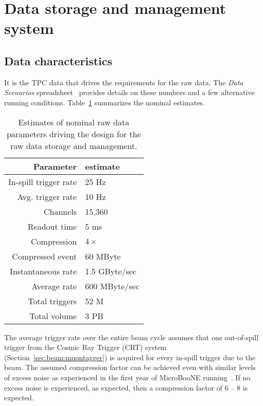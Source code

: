 \section{Data storage and management system}

\subsection{Data characteristics}

It is the TPC data that drives the requirements for the raw \pdsp data.
The \textit{\pdsp Data Scenarios} spreadsheet~\cite{data_spreadsheet}  %
provides details on these %
numbers and a few alternative running conditions.
Table~\ref{tab:goldi} summarizes the nominal estimates.

\begin{table}[h]
  \centering
  \begin{tabular}[h]{|r|l|}
    \hline
    Parameter & estimate  \\
    \hline
    In-spill trigger rate & 25 Hz \\
    Avg. trigger rate & 10 Hz \\
    Channels & 15,360 \\
    Readout time & 5 ms \\
    Compression & $4\times$ \\
    \hline
    Compressed event & 60 MByte  \\
    Instantaneous rate & 1.5 GByte/sec \\
    Average rate & 600 MByte/sec \\
    \hline
    Total triggers & 52 M \\
    Total volume & 3 PB  \\
    \hline
  \end{tabular}
  \caption{Estimates of nominal raw data parameters driving the design for the raw data storage and management.}
  \label{tab:goldi}
\end{table}

The average trigger rate over the entire beam cycle assumes that one
out-of-spill trigger from the Cosmic Ray Trigger (CRT) system (Section~\ref{sec:beam:muontagger}) 
is acquired
for every in-spill trigger due to the beam.  The assumed compression
factor can be achieved even with similar levels of excess noise as
experienced in the first year of MicroBooNE running~\cite{qian-viren-reduc}.
If no excess noise is experienced, as expected, then a compression factor
of 6 -- 8 is expected.  


